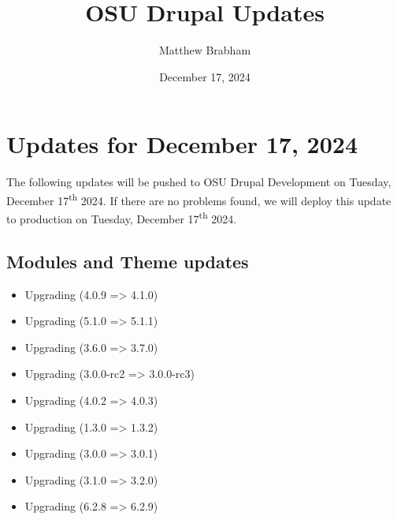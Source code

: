 
\title{OSU Drupal Updates}
\author{Matthew Brabham}
\date{December 17, 2024}

    \maketitle
    \tableofcontents


    \section{Updates for December 17, 2024}
    The following updates will be pushed to OSU Drupal Development on Tuesday, December 17\textsuperscript{th} 2024.
    If there are no problems found, we will deploy this update to production on Tuesday, December 17\textsuperscript{th} 2024.

    \subsection{Modules and Theme updates}

    \begin{itemize}
        \item Upgrading  (4.0.9 => 4.1.0)
        \item Upgrading  (5.1.0 => 5.1.1)
        \item Upgrading  (3.6.0 => 3.7.0)
        \item Upgrading  (3.0.0-rc2 => 3.0.0-rc3)
        \item Upgrading  (4.0.2 => 4.0.3)
        \item Upgrading  (1.3.0 => 1.3.2)
        \item Upgrading  (3.0.0 => 3.0.1)
        \item Upgrading  (3.1.0 => 3.2.0)
        \item Upgrading  (6.2.8 => 6.2.9)
    \end{itemize}

